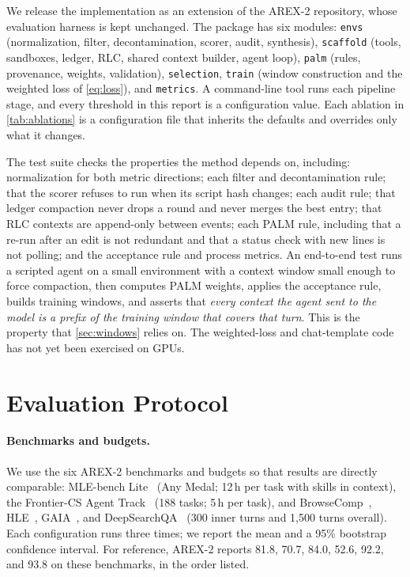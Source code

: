 \documentclass[11pt]{article}
\newcommand{\code}[1]{\texttt{#1}}
\begin{document}
We release the implementation as an extension of the AREX-2 repository, whose evaluation harness is kept unchanged. The package has six modules: \code{envs} (normalization, filter, decontamination, scorer, audit, synthesis), \code{scaffold} (tools, sandboxes, ledger, RLC, shared context builder, agent loop), \code{palm} (rules, provenance, weights, validation), \code{selection}, \code{train} (window construction and the weighted loss of \cref{eq:loss}), and \code{metrics}. A command-line tool runs each pipeline stage, and every threshold in this report is a configuration value. Each ablation in \cref{tab:ablations} is a configuration file that inherits the defaults and overrides only what it changes.

The test suite checks the properties the method depends on, including: normalization for both metric directions; each filter and decontamination rule; that the scorer refuses to run when its script hash changes; each audit rule; that ledger compaction never drops a round and never merges the best entry; that RLC contexts are append-only between events; each PALM rule, including that a re-run after an edit is not redundant and that a status check with new lines is not polling; and the acceptance rule and process metrics. An end-to-end test runs a scripted agent on a small environment with a context window small enough to force compaction, then computes PALM weights, applies the acceptance rule, builds training windows, and asserts that \emph{every context the agent sent to the model is a prefix of the training window that covers that turn}. This is the property that \cref{sec:windows} relies on. The weighted-loss and chat-template code has not yet been exercised on GPUs.

\section{Evaluation Protocol}
\label{sec:protocol}

\paragraph{Benchmarks and budgets.}
We use the six AREX-2 benchmarks and budgets so that results are directly comparable: MLE-bench Lite~\citep{chan2025mlebench} (Any Medal; 12\,h per task with skills in context), the Frontier-CS Agent Track~\citep{mang2025frontiercs} (188 tasks; 5\,h per task), and BrowseComp~\citep{wei2025browsecomp}, HLE~\citep{phan2025hle}, GAIA~\citep{mialon2023gaia}, and DeepSearchQA~\citep{gupta2026deepsearchqa} (300 inner turns and 1{,}500 turns overall). Each configuration runs three times; we report the mean and a 95\% bootstrap confidence interval. For reference, AREX-2 reports 81.8, 70.7, 84.0, 52.6, 92.2, and 93.8 on these benchmarks, in the order listed.
\end{document}
